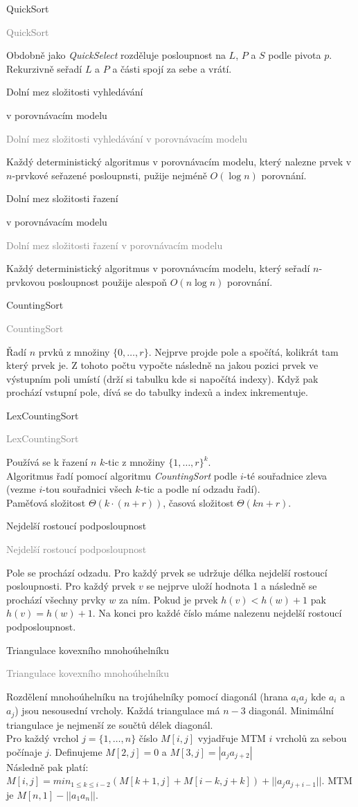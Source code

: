 \documentclass[20pt]{extarticle}
\newcommand{\card}[3][]{
	\vspace*{\fill}

	\newpage
	\topskip0pt
	\vspace*{\fill}
		\Large #2

		\vspace{1cm}
		\normalsize #1
	\vspace*{\fill}
	\newpage

	\small \textcolor{gray}{#2 #1}
	\topskip0pt
	\vspace*{\fill}

	\normalsize
	#3
	\vspace*{\fill}
}
\begin{document}
\begin{center}
\card{QuickSort}{
	Obdobně jako \textit{QuickSelect} rozděluje posloupnost na $L$, $P$ a $S$ podle pivota $p$.
	Rekurzivně seřadí $L$ a $P$ a části spojí za sebe a vrátí.
}

\card[v porovnávacím modelu]{Dolní mez složitosti vyhledávání}{
	Každý deterministický algoritmus v porovnávacím modelu, který nalezne prvek v
	$n$-prvkové seřazené posloupnsti, pužije nejméně $O(\log n)$ porovnání.
}

\card[v porovnávacím modelu]{Dolní mez složitosti řazení}{
	Každý deterministický algoritmus v porovnávacím modelu, který seřadí $n$-prvkovou
	posloupnost použije alespoň $O(n \log n)$ porovnání.
}

\card{CountingSort}{
	Řadí $n$ prvků z množiny $\{0, \dots, r\}$. Nejprve projde pole a spočítá,
	kolikrát tam který prvek je. Z tohoto počtu vypočte následně na jakou pozici
	prvek ve výstupním poli umístí (drží si tabulku kde si napočítá indexy). Když
	pak prochází vstupní pole, dívá se do tabulky indexů a index inkrementuje.
}

\card{LexCountingSort}{
	Používá se k řazení $n$ $k$-tic z množiny $\{1, \dots, r\}^k$.\\
	Algoritmus řadí pomocí algoritmu \textit{CountingSort} podle $i$-té souřadnice
	zleva (vezme $i$-tou souřadnici všech $k$-tic a podle ní odzadu řadí).\\
	Paměťová složitost $\Theta(k \cdot (n+r))$, časová složitost $\Theta(kn+r)$.
}

\card{Nejdelší rostoucí podposloupnost}{
	Pole se prochází odzadu. Pro každý prvek se udržuje délka nejdelší rostoucí posloupnosti.
	Pro každý prvek $v$ se nejprve uloží hodnota 1 a následně se prochází všechny prvky $w$ za ním.
	Pokud je prvek $h(v) < h(w) + 1$ pak $h(v) = h(w) + 1$. Na konci pro každé číslo
	máme nalezenu nejdelší rostoucí podposloupnost.
}

\card{Triangulace kovexního mnohoúhelníku}{
	\small
	Rozdělení mnohoúhelníku na trojúhelníky pomocí diagonál (hrana $a_i a_j$ kde
	$a_i$ a $a_j$) jsou nesousední vrcholy. Každá triangulace má $n-3$ diagonál.
	Minimální triangulace je nejmenší ze součtů délek diagonál.\\
	Pro každý vrchol $j = \{1, \dots, n\}$ číslo $M[i, j]$ vyjadřuje MTM $i$ vrcholů
	za sebou počínaje $j$. Definujeme $M[2,j] = 0$ a $M[3, j] = |a_ja_{j+2}|$\\
	Následně pak platí: $M[i,j] = min_{1\leq k\leq i-2}(M[k+1, j] + M[i-k, j+k]) + ||a_ja_{j+i-1}||$.
	MTM je $M[n, 1] - ||a_1a_n||$.
}


\end{center}
\end{document}
